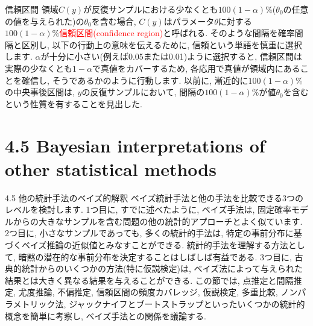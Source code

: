 \documentclass[10pt,dvipdfmx,a4]{beamer}
\newcommand{\tcr}[1]{\textcolor{red}{#1}}
\begin{document}

\begin{frame}{信頼区間}
領域$C(y)$が反復サンプルにおける少なくとも$100(1-\alpha)\%$($\theta_0$の任意の値を与えられた)の$\theta_0$を含む場合, $C(y)$はパラメータ$\theta$に対する $100(1-\alpha)\%$\tcr{信頼区間(confidence region)}と呼ばれる.
そのような間隔を確率間隔と区別し, 以下の行動上の意味を伝えるために, 信頼という単語を慎重に選択します.
$\alpha$が十分に小さい(例えば0.05または0.01)ように選択すると, 信頼区間は実際の少なくとも$1-\alpha$で真値をカバーするため, 各応用で真値が領域内にあることを確信し, そうであるかのように行動します.
以前に, 漸近的に$100(1- \alpha)\%$の中央事後区間は, $y$の反復サンプルにおいて, 間隔の$100(1-\alpha)\%$が値$\theta_0$を含むという性質を有することを見出した.
\end{frame}

\section{4.5 Bayesian interpretations of other statistical methods}
\begin{frame}{4.5 他の統計手法のベイズ的解釈}
ベイズ統計手法と他の手法を比較できる3つのレベルを検討します.
1つ目に, すでに述べたように, ベイズ手法は, 固定確率モデルからの大きなサンプルを含む問題の他の統計的アプローチとよく似ています.
2つ目に, 小さなサンプルであっても, 多くの統計的手法は, 特定の事前分布に基づくベイズ推論の近似値とみなすことができる.
統計的手法を理解する方法として, 暗黙の潜在的な事前分布を決定することはしばしば有益である.
3つ目に, 古典的統計からのいくつかの方法(特に仮説検定)は, ベイズ法によって与えられた結果とは大きく異なる結果を与えることができる.
この節では, 点推定と間隔推定, 尤度推論, 不偏推定, 信頼区間の頻度カバレッジ, 仮説検定, 多重比較, ノンパラメトリック法, ジャックナイフとブートストラップといったいくつかの統計的概念を簡単に考察し, ベイズ手法との関係を議論する.
\end{frame}

\end{document}
